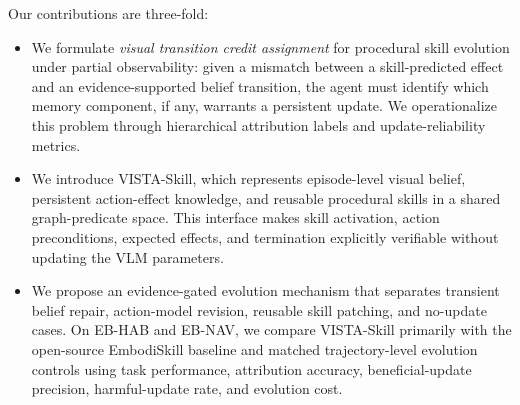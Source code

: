 

Our contributions are three-fold:

\begin{itemize}
  \item We formulate \emph{visual transition credit assignment} for procedural skill evolution under partial observability: given a mismatch between a skill-predicted effect and an evidence-supported belief transition, the agent must identify which memory component, if any, warrants a persistent update. We operationalize this problem through hierarchical attribution labels and update-reliability metrics.
  \item We introduce VISTA-Skill, which represents episode-level visual belief, persistent action-effect knowledge, and reusable procedural skills in a shared graph-predicate space. This interface makes skill activation, action preconditions, expected effects, and termination explicitly verifiable without updating the VLM parameters.
  \item We propose an evidence-gated evolution mechanism that separates transient belief repair, action-model revision, reusable skill patching, and no-update cases. On EB-HAB and EB-NAV, we compare VISTA-Skill primarily with the open-source EmbodiSkill baseline and matched trajectory-level evolution controls using task performance, attribution accuracy, beneficial-update precision, harmful-update rate, and evolution cost.
\end{itemize}

